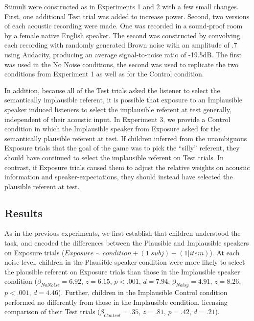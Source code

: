 \documentclass[man,floatsintext]{apa6}
\begin{document}
Stimuli were constructed as in Experiments 1 and 2 with a few small changes. First, one additional Test trial was added to increase power. Second, two versions of each acoustic recording were made. One was recorded in a sound-proof room by a female native English speaker. The second was constructed by convolving each recording with randomly generated Brown noise with an amplitude of .7 using Audacity, producing an average signal-to-noise ratio of -19.5dB. The first was used in the No Noise conditions, the second was used to replicate the two conditions from Experiment 1 as well as for the Control condition.

In addition, because all of the Test trials asked the listener to select the semantically implausible referent, it is possible that exposure to an Implausible speaker induced listeners to select the implausible referent at test generally, independent of their acoustic input.  In Experiment 3, we provide a Control condition in which the Implausible speaker from Exposure asked for the semantically plausible referent at test. If children inferred from the unambiguous Exposure trials that the goal of the game was to pick the ``silly'' referent, they should have continued to select the implausible referent on Test trials. In contrast, if Exposure trials caused them to adjust the relative weights on acoustic information and speaker-expectations, they should instead have selected the plausible referent at test.

\subsection{Results}

As in the previous experiments, we first establish that children understood the task, and encoded the differences between the Plausible and Implausible speakers on Exposure trials ($Exposure \sim condition + (1|subj) + (1|item)$). At each noise level, children in the Plausible speaker condition were more likely to select the plausible referent on Exposure trials than those in the Implausible speaker condition ($\beta_{No Noise} = 6.92$, $z =6.15$, $p < .001$, $d = 7.94$; $\beta_{Noisy} = 4.91$, $z =8.26$, $p < .001$, $d = 4.46$). Further, children in the Implausible Control condition performed no differently from those in the Implausible condition, licensing comparison of their Test trials ($\beta_{Control} = .35$, $z =.81$, $p = .42$, $d = .21$).
\end{document}
